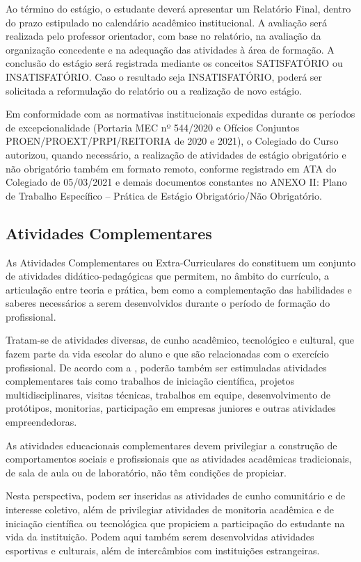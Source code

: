 Ao término do estágio, o estudante deverá apresentar um Relatório Final, dentro do prazo estipulado no calendário acadêmico institucional. A avaliação será realizada pelo professor orientador, com base no relatório, na avaliação da organização concedente e na adequação das atividades à área de formação. A conclusão do estágio será registrada mediante os conceitos SATISFATÓRIO ou INSATISFATÓRIO. Caso o resultado seja INSATISFATÓRIO, poderá ser solicitada a reformulação do relatório ou a realização de novo estágio.

Em conformidade com as normativas institucionais expedidas durante os períodos de excepcionalidade (Portaria MEC nº 544/2020 e Ofícios Conjuntos PROEN/PROEXT/PRPI/REITORIA de 2020 e 2021), o Colegiado do Curso autorizou, quando necessário, a realização de atividades de estágio obrigatório e não obrigatório também em formato remoto, conforme registrado em ATA do Colegiado de 05/03/2021 e demais documentos constantes no ANEXO II: Plano de Trabalho Específico – Prática de Estágio Obrigatório/Não Obrigatório.



\subsection{Atividades Complementares}

As Atividades Complementares ou Extra-Curriculares do \NOMECURSO constituem um conjunto de atividades didático-pedagógicas que permitem, no âmbito do currículo, a articulação entre teoria e prática, bem como a complementação das habilidades e saberes necessários a serem desenvolvidos durante o período de formação do profissional.

Tratam-se de atividades diversas, de cunho acadêmico, tecnológico e cultural, que fazem parte da vida escolar do aluno e que são relacionadas com o exercício profissional. De acordo com a , poderão também ser estimuladas atividades complementares tais como trabalhos de iniciação científica, projetos multidisciplinares, visitas técnicas, trabalhos em equipe, desenvolvimento de protótipos, monitorias, participação em empresas juniores e outras atividades empreendedoras.

As atividades educacionais complementares devem privilegiar a construção de comportamentos sociais e profissionais que as atividades acadêmicas tradicionais, de sala de aula ou de laboratório, não têm condições de propiciar.

Nesta perspectiva, podem ser inseridas as atividades de cunho comunitário e de interesse coletivo, além de privilegiar atividades de monitoria acadêmica e de iniciação científica ou tecnológica que propiciem a participação do estudante na vida da instituição. Podem aqui também serem desenvolvidas atividades esportivas e culturais, além de intercâmbios com instituições estrangeiras.


